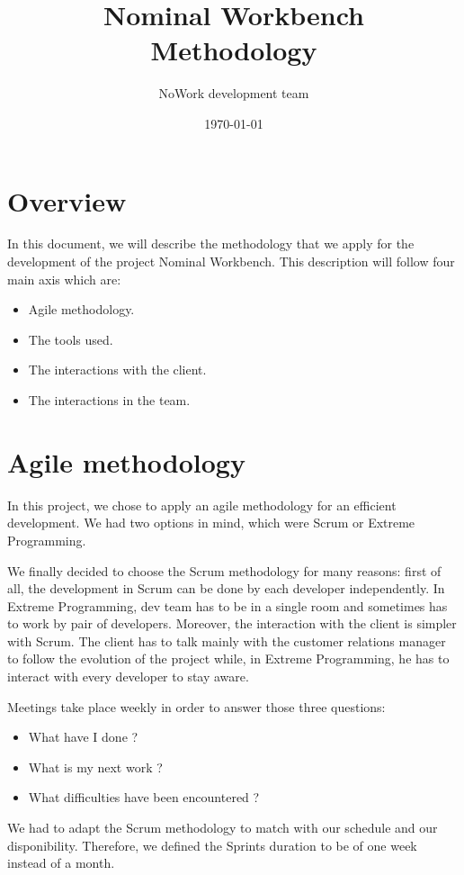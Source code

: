 \documentclass[12pt,a4paper]{article}
\title{Nominal Workbench\\
Methodology}
\author{NoWork development team\\[2em]}
\date\today
\begin{document}
\maketitle

\section{Overview}

In this document, we will describe the methodology that we apply for
the development of the project Nominal Workbench. This description
will follow four main axis which are:
\begin{itemize}
\item Agile methodology.
\item The tools used.
\item The interactions with the client.
\item The interactions in the team.
\end{itemize}

\section{Agile methodology}

In this project, we chose to apply an agile methodology for an
efficient development. We had two options in mind, which were Scrum or
Extreme Programming.

We finally decided to choose the Scrum methodology for many reasons:
first of all, the development in Scrum can be done by each developer
independently. In Extreme Programming, dev team has to be in a single
room and sometimes has to work by pair of developers. Moreover,
the interaction with the client is simpler with Scrum. The client has
to talk mainly with the customer relations manager to follow the
evolution of the project while, in Extreme Programming, he has to
interact with every developer to stay aware.

Meetings take place weekly in order to answer those three questions:
\begin{itemize}
\item What have I done ?
\item What is my next work ?
\item What difficulties have been encountered ?
\end{itemize}

We had to adapt the Scrum methodology to match with our schedule and
our disponibility. Therefore, we defined the Sprints duration to be of
one week instead of a month.
\end{document}

